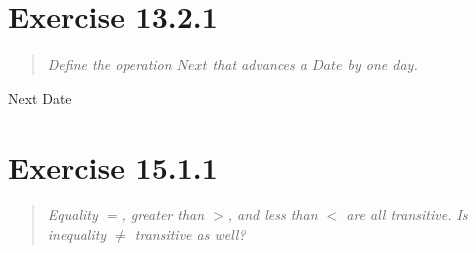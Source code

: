 \documentclass[10pt]{article}
\begin{document}
\tocheck



\section{Exercise 13.2.1}
\begin{quote}
  {\it
    Define the operation $Next$ that advances a $Date$ by one day.
  }
\end{quote}


\begin{spec}
  \begin{schema}{Next}
    \Delta Date\\
    \where
  \end{schema}
\end{spec}
\tofinish



\section{Exercise 15.1.1}
\begin{quote}
  {\it
    Equality $=$, greater than $>$, and less than $<$ are all transitive. Is inequality $\neq$
    transitive as well?
  }
\end{quote}
\tostart
\end{document}
